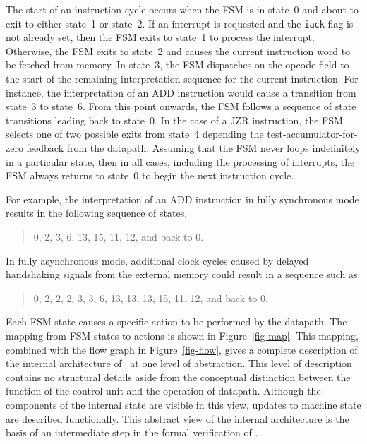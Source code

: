 The start of an instruction cycle 
occurs when the FSM is in state~0 and about to exit to either state~1
or state~2.
If an interrupt is requested and the \verb"iack" flag is
not already set, then the FSM exits to state~1 to process the interrupt.
Otherwise, the FSM exits to state~2 and causes
the current instruction word to be fetched from memory.
In state~3, the FSM dispatches on the opcode field to
the start of the remaining interpretation sequence for
the current instruction.
For instance, the interpretation of an ADD instruction would cause
a transition from state~3 to state~6.
From this point onwards, the FSM follows a sequence of state
transitions leading back to state~0.
In the case of a JZR instruction, the FSM selects one of two possible exits
from state~4 depending the
\mbox{test-accumulator-for-zero} feedback from the datapath.
Assuming that the FSM never loops indefinitely in a particular state,
then in all cases, including the processing of interrupts,
the FSM always returns to state~0 to begin the next instruction cycle.

For example,
the interpretation of an ADD instruction in fully synchronous mode
results in the following sequence of states.

\begin{quote}
0, 2, 3, 6, 13, 15, 11, 12, and back to 0.
\end{quote}

In fully asynchronous mode, additional clock cycles caused by
delayed handshaking signals from the external memory could result
in a sequence such as:

\begin{quote}
0, 2, 2, 2, 3, 3, 6, 13, 13, 13, 15, 11, 12, and back to 0.
\end{quote}

Each FSM state causes a specific action to be performed by the datapath.
The mapping from FSM states to actions is shown in Figure~\ref{fig-map}.
This mapping,
combined with the flow graph in Figure~\ref{fig-flow},
gives a complete description
of the internal architecture of
\Tamarack\ at one level of abstraction.
This level of description contains no structural details aside
from the conceptual distinction between the
function of the control unit
and the operation of datapath.
Although the components of the internal state are visible in this view,
updates to machine state are described functionally.
This abstract view of the internal architecture is the basis
of an intermediate
step in the formal verification of \Tamarack.

